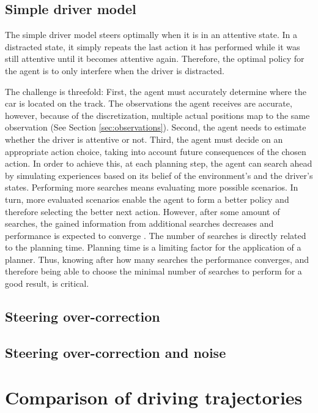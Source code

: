 
\subsection{Simple driver model}


The simple driver model steers optimally when it is in an attentive state. In a distracted state, it simply repeats the last action it has performed while it was still attentive until it becomes attentive again. Therefore, the optimal policy for the agent is to only interfere when the driver is distracted. 

The challenge is threefold: First, the agent must accurately determine where the car is located on the track. The observations the agent receives are accurate, however, because of the discretization, multiple actual positions map to the same observation (See Section \ref{sec:observations}). Second, the agent needs to estimate whether the driver is attentive or not. Third, the agent must decide on an appropriate action choice, taking into account future consequences of the chosen action. In order to achieve this, at each planning step, the agent can search ahead by simulating experiences based on its belief of the environment's and the driver's states. Performing more searches means evaluating more possible scenarios. In turn, more evaluated scenarios enable the agent to form a better policy and therefore selecting the better next action. However, after some amount of searches, the gained information from additional searches decreases and performance is expected to converge \parencite{pomcp}. The number of searches is directly related to the planning time. Planning time is a limiting factor for the application of a planner. Thus, knowing after how many searches the performance converges, and therefore being able to choose the minimal number of searches to perform for a good result, is critical.





\subsection{Steering over-correction}



\subsection{Steering over-correction and noise}



\section{Comparison of driving trajectories}




